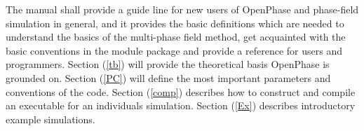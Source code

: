 The manual shall provide a guide line for new users of OpenPhase and phase-field simulation in general, and it provides the basic definitions which are needed to understand the basics of the multi-phase field method, get acquainted with the basic conventions in the module package and provide a reference for users and programmers. Section (\ref{tb}) will provide the theoretical basis OpenPhase is grounded on. Section (\ref{PC}) will define the most important parameters and conventions of the code. Section (\ref{comp}) describes how to construct and compile an executable for an individuals simulation. Section (\ref{Ex}) describes introductory example simulations.

